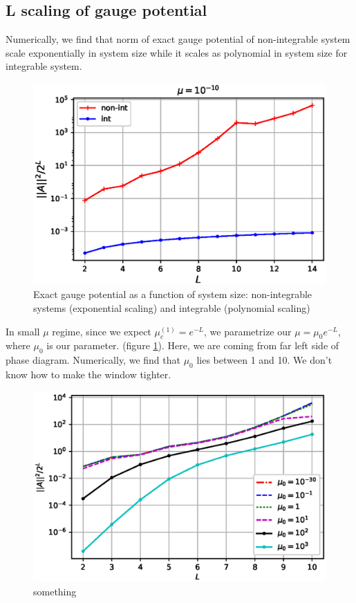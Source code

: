 \documentclass[11pt,a4paper]{article}
\begin{document}
\subsection{L scaling of gauge potential}
Numerically, we find that norm of exact gauge potential of non-integrable system scale exponentially in system size while it scales as polynomial in system size for integrable system.
\begin{figure}[!ht]
\begin{center}
\includegraphics[scale=0.7]{new_pics/v2_1_norm_L_scaling.eps}
\caption{Exact gauge potential as a function of system size: non-integrable systems (exponential scaling) and integrable (polynomial scaling) }
\end{center}
\end{figure}

In small $\mu$ regime, since we expect $\mu_c^{(1)}= e^{-L}$, we parametrize our $\mu= \mu_0 e^{-L}$, where $\mu_0$ is our parameter. (figure \ref{param_nonintegrable}). Here, we are coming from far left side of phase diagram. Numerically, we find that $\mu_0$ lies between 1 and 10. We don't know how to make the window tighter.

\begin{figure}[!ht]
\begin{center}
\includegraphics[scale=0.72]{new_pics/scaling_exp_poly.eps}
\caption{something }
\label{param_nonintegrable}
\end{center}
\end{figure}
\end{document}
